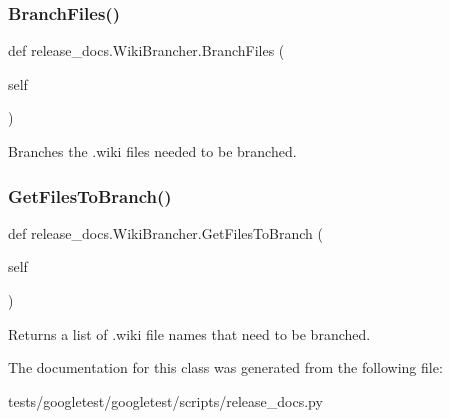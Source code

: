 \subsubsection{\texorpdfstring{Branch\+Files()}{BranchFiles()}}
{\footnotesize\ttfamily def release\+\_\+docs.\+Wiki\+Brancher.\+Branch\+Files (\begin{DoxyParamCaption}\item[{}]{self }\end{DoxyParamCaption})}

\begin{DoxyVerb}Branches the .wiki files needed to be branched.\end{DoxyVerb}
 \mbox{\label{classrelease__docs_1_1WikiBrancher_a05fc4282f501fb0210ecb33fd1d209a6}} 
\subsubsection{\texorpdfstring{Get\+Files\+To\+Branch()}{GetFilesToBranch()}}
{\footnotesize\ttfamily def release\+\_\+docs.\+Wiki\+Brancher.\+Get\+Files\+To\+Branch (\begin{DoxyParamCaption}\item[{}]{self }\end{DoxyParamCaption})}

\begin{DoxyVerb}Returns a list of .wiki file names that need to be branched.\end{DoxyVerb}
 

The documentation for this class was generated from the following file\+:\begin{DoxyCompactItemize}
\item 
tests/googletest/googletest/scripts/release\+\_\+docs.\+py\end{DoxyCompactItemize}
